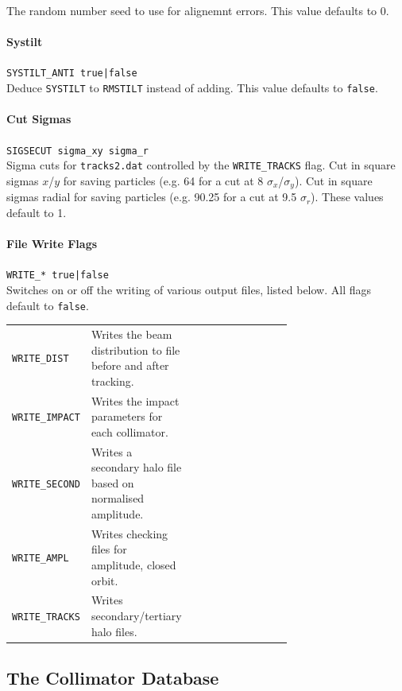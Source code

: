 The random number seed to use for alignemnt errors.
This value defaults to 0.

\paragraph{Systilt} \texttt{SYSTILT\_ANTI true|false}\\

Deduce \texttt{SYSTILT} to \texttt{RMSTILT} instead of adding.
This value defaults to \texttt{false}.

\paragraph{Cut Sigmas} \texttt{SIGSECUT sigma\_xy sigma\_r}\\

Sigma cuts for \texttt{tracks2.dat} controlled by the \texttt{WRITE\_TRACKS} flag.
Cut in square sigmas $x$/$y$ for saving particles (e.g. 64 for a cut at 8 $\sigma_x$/$\sigma_y$).
Cut in square sigmas radial for saving particles (e.g. 90.25 for a cut at 9.5 $\sigma_r$).
These values default to 1.

\paragraph{File Write Flags} \texttt{WRITE\_* true|false}\\

Switches on or off the writing of various output files, listed below.
All flags default to \texttt{false}.

\bigskip
\begin{tabular}{@{}llp{0.7\linewidth}}
    \texttt{WRITE\_DIST}   & Writes the beam distribution to file before and after tracking. \\
    \texttt{WRITE\_IMPACT} & Writes the impact parameters for each collimator. \\
    \texttt{WRITE\_SECOND} & Writes a secondary halo file based on normalised amplitude. \\
    \texttt{WRITE\_AMPL}   & Writes checking files for amplitude, closed orbit. \\
    \texttt{WRITE\_TRACKS} & Writes secondary/tertiary halo files.
\end{tabular}


\subsection{The Collimator Database}\label{Sec:CollDB}

